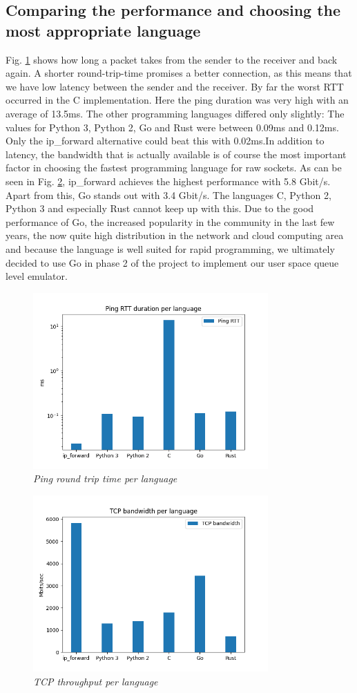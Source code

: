 \subsection{Comparing the performance and choosing the most appropriate language}
Fig. \ref{fig:ping} shows how long a packet takes from the sender to the receiver and back again. A shorter round-trip-time promises a better connection, as this means that we have low latency between the sender and the receiver. By far the worst RTT occurred in the C implementation. Here the ping duration was very high with an average of 13.5ms. The other programming languages differed only slightly: The values for Python 3, Python 2, Go and Rust were between 0.09ms and 0.12ms. Only the ip\_forward alternative could beat this with 0.02ms.\newline In addition to latency, the bandwidth that is actually available is of course the most important factor in choosing the fastest programming language for raw sockets. As can be seen in Fig. \ref{fig:tcp}, ip\_forward achieves the highest performance with 5.8 Gbit/s. Apart from this, Go stands out with 3.4 Gbit/s. The languages C, Python 2, Python 3 and especially Rust cannot keep up with this.\newline
Due to the good performance of Go, the increased popularity in the community in the last few years, the now quite high distribution in the network and cloud computing area and because the language is well suited for rapid programming, we ultimately decided to use Go in phase 2 of the project to implement our user space queue level emulator.
\begin{figure}[htbp]
\centering
\includegraphics*[width=9cm]{ping}
\caption{\em Ping round trip time per language}
\label{fig:ping}
\end{figure}
\begin{figure}[htbp]
\centering
\includegraphics*[width=9cm]{tcp}
\caption{\em TCP throughput per language}
\label{fig:tcp}
\end{figure}
